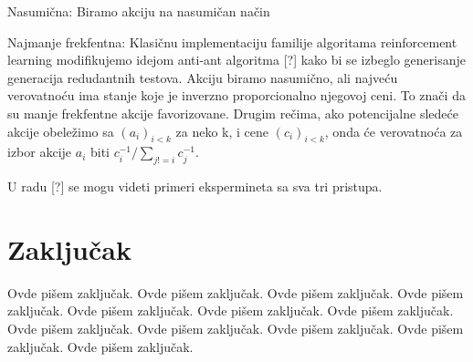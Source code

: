 \documentclass[a4paper]{article}
\begin{document}
Nasumična: 
Biramo akciju na nasumičan način

Najmanje frekfentna: 
Klasičnu implementaciju familije algoritama reinforcement learning modifikujemo idejom anti-ant algoritma [?] kako bi se izbeglo generisanje generacija redudantnih testova. %
Akciju biramo nasumično, ali najveću verovatnoću ima stanje koje je inverzno proporcionalno njegovoj ceni. To znači da su manje frekfentne akcije favorizovane.
Drugim rečima, ako potencijalne sledeće akcije obeležimo sa $(a_i)_{i < k}$ za neko k, i cene $(c_i)_{i < k}$, onda će verovatnoća za izbor akcije $a_i$ biti $c_i^{-1} / \sum_{j!=i}^{} c_j^{-1}$.

U radu [?] se mogu videti primeri ekspermineta sa sva tri pristupa. %


\section{Zaključak}
\label{sec:zakljucak}



Ovde pišem zaključak.
Ovde pišem zaključak.
Ovde pišem zaključak.
Ovde pišem zaključak.
Ovde pišem zaključak.
Ovde pišem zaključak.
Ovde pišem zaključak.
Ovde pišem zaključak.
Ovde pišem zaključak.
Ovde pišem zaključak.
Ovde pišem zaključak.
Ovde pišem zaključak.



\appendix


\end{document}

